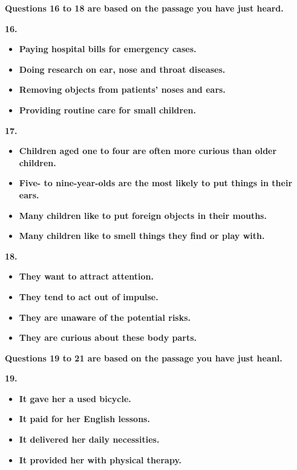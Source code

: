 \documentclass[UTF8,11pt]{ctexart}
\begin{document}
\textbf{Questions 16 to 18 are based on the passage you have just heard.}


\textbf{16.}


\begin{itemize}[leftmargin=2em,itemsep=.2em,topsep=.4em]\item[A.] \textbf{Paying hospital bills for emergency cases.}
\item[B.] \textbf{Doing research on ear, nose and throat diseases.}
\item[C.] \textbf{Removing objects from patients' noses and ears.}
\item[D.] \textbf{Providing routine care for small children.}
\end{itemize}

\textbf{17.}


\begin{itemize}[leftmargin=2em,itemsep=.2em,topsep=.4em]\item[A.] \textbf{Children aged one to four are often more curious than older children.}
\item[B.] \textbf{Five- to nine-year-olds are the most likely to put things in their ears.}
\item[C.] \textbf{Many children like to put foreign objects in their mouths.}
\item[D.] \textbf{Many children like to smell things they find or play with.}
\end{itemize}

\textbf{18.}


\begin{itemize}[leftmargin=2em,itemsep=.2em,topsep=.4em]\item[A.] \textbf{They want to attract attention.}
\item[B.] \textbf{They tend to act out of impulse.}
\item[C.] \textbf{They are unaware of the potential risks.}
\item[D.] \textbf{They are curious about these body parts.}
\end{itemize}

\textbf{Questions 19 to 21 are based on the passage you have just heanl.}


\textbf{19.}


\begin{itemize}[leftmargin=2em,itemsep=.2em,topsep=.4em]\item[A.] \textbf{It gave her a used bicycle.}
\item[B.] \textbf{It paid for her English lessons.}
\item[C.] \textbf{It delivered her daily necessities.}
\item[D.] \textbf{It provided her with physical therapy.}
\end{itemize}
\end{document}
